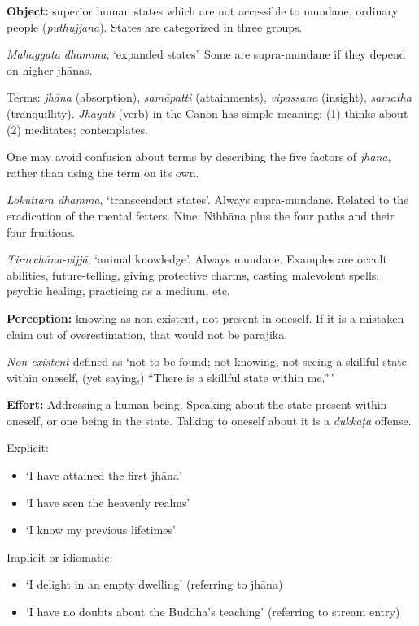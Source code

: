 \textbf{Object:} superior human states which are not accessible to
mundane, ordinary people (\emph{puthujjana}). States are categorized in
three groups.

\emph{Mahaggata dhamma}, `expanded states'. Some are supra-mundane if
they depend on higher jhānas.

Terms: \emph{jhāna} (absorption), \emph{samāpatti} (attainments),
\emph{vipassana} (insight), \emph{samatha} (tranquillity).
\emph{Jhāyati} (verb) in the Canon has simple meaning: (1) thinks about
(2) meditates; contemplates.

One may avoid confusion about terms by describing the five factors of
\emph{jhāna}, rather than using the term on its own.

\emph{Lokuttara dhamma}, `transcendent states'. Always supra-mundane.
Related to the eradication of the mental fetters. Nine: Nibbāna plus the
four paths and their four fruitions.

\emph{Tiracchāna-vijjā}, `animal knowledge'. Always mundane. Examples
are occult abilities, future-telling, giving protective charms, casting
malevolent spells, psychic healing, practicing as a medium, etc.

\textbf{Perception:} knowing as non-existent, not present in oneself. If
it is a mistaken claim out of overestimation, that would not be
parajika.

\emph{Non-existent} defined as `not to be found; not knowing, not seeing
a skillful state within oneself, (yet saying,) ``There is a skillful
state within me.''\,'

\textbf{Effort:} Addressing a human being. Speaking about the state
present within oneself, or one being in the state. Talking to oneself
about it is a \emph{dukkaṭa} offense.

Explicit:

\begin{itemize}
\tightlist
\item
  `I have attained the first jhāna'
\item
  `I have seen the heavenly realms'
\item
  `I know my previous lifetimes'
\end{itemize}

Implicit or idiomatic:

\begin{itemize}
\tightlist
\item
  `I delight in an empty dwelling' (referring to jhāna)
\item
  `I have no doubts about the Buddha's teaching' (referring to stream
  entry)
\end{itemize}

